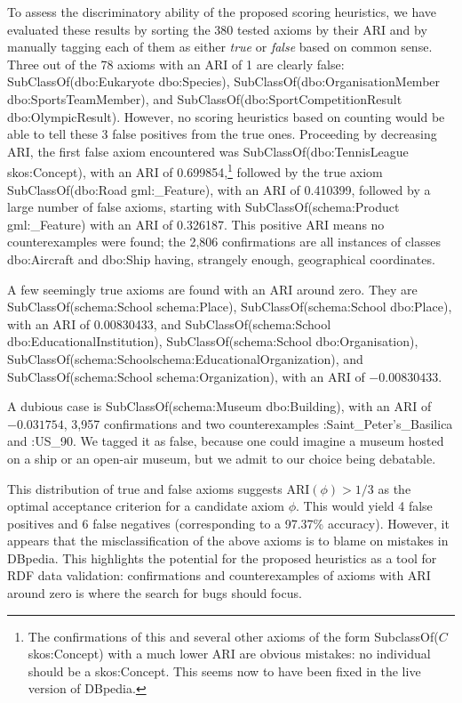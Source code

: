 \documentclass{llncs}
\begin{document}
To assess the discriminatory ability of the proposed scoring heuristics,
we have evaluated these results by sorting the
380
tested axioms by their ARI and by manually tagging each of them as either \emph{true} or \emph{false} based on common sense.
Three out of the 78 axioms with an ARI of 1 are clearly false: 
\textsf{SubClassOf(dbo:Eukaryote dbo:Species)},
\textsf{SubClassOf(dbo:OrganisationMember dbo:Sports\-TeamMember)}, and
\textsf{SubClassOf(dbo:SportCompetitionResult dbo:OlympicResult)}.
However, no scoring heuristics based on counting would be able to tell
these 3 false positives from the true ones.
Proceeding by decreasing ARI, the first false axiom encountered was
\textsf{SubClassOf(dbo:TennisLeague skos:Concept)}, with an ARI of 0.699854,\footnote{The confirmations of this and several other axioms of the form \textsf{SubclassOf($C$ skos:Concept)}
with a much lower ARI are obvious mistakes: no individual should be a
\textsf{skos:Concept}. This seems now to have been fixed in the live version of DBpedia.}
followed by the true axiom \textsf{SubClassOf(dbo:Road gml:\_Feature)},
with an ARI of 0.410399, followed by a large number of false axioms, starting with
\textsf{SubClassOf(schema:Product gml:\_Feature)} with an ARI of 0.326187.
This positive ARI means no counterexamples were found; the 2,806 confirmations are all
instances of classes \textsf{dbo:Aircraft} and \textsf{dbo:Ship} having, strangely enough, geographical coordinates.

A few seemingly true axioms are found with an ARI around zero. They are
\textsf{SubClassOf(schema:School schema:Place)},
\textsf{SubClassOf(schema:School dbo:\-Place)}, with an ARI of 0.00830433,
and
\textsf{SubClassOf(schema:School dbo:EducationalInstitu\-tion)},
\textsf{SubClassOf(schema:School dbo:Organisation)},
\textsf{SubClassOf(schema:School\break schema:EducationalOrganization)}, and
\textsf{SubClassOf(schema:School schema:Organ\-ization)}, with an ARI of $-0.00830433$.

A dubious case is
\textsf{SubClassOf(schema:Museum dbo:Building)}, with an ARI of $-0.031754$,
3,957 confirmations and two counterexamples \textsf{:Saint\_Peter's\-\_Basilica} and
\textsf{:US\_90}. We tagged it as false, because one could imagine
a museum hosted on a ship or an open-air museum, but we admit to our choice being debatable.

This distribution of true and false axioms suggests $\mathrm{ARI}(\phi)>1/3$
as the optimal acceptance criterion for a candidate axiom $\phi$.
This would yield 4 false positives and 6 false negatives (corresponding to a
97.37\%
accuracy).
However, it appears that the misclassification of the above axioms is to blame
on mistakes in DBpedia. This highlights the potential for the proposed heuristics
as a tool for RDF data validation: confirmations and counterexamples of axioms
with ARI around zero is where the search for bugs should focus.
\end{document}
